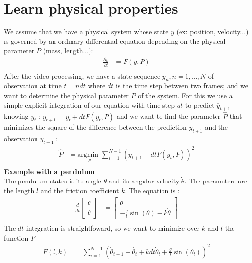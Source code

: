 \documentclass[11pt, oneside]{amsart}
\begin{document}
\section{Learn physical properties}
We assume that we have a physical system whose state $y$ (ex: position, velocity...) is governed by an ordinary differential equation depending on the physical parameter $P$ (mass, length...):
\begin{align*}
  \frac{\partial y}{\partial t} &= F(y, P)\\
\end{align*}
After the video processing, we have a state sequence $y_n, n=1, \ldots, N$ of observation at time $t = n dt$ where $dt$ is the time step between two frames; and we want to determine the physical parameter $P$ of the system.
For this we use a simple explicit integration of our equation with time step $dt$ to predict $\overline{y}_{t+1}$ knowing $y_t$ : $\overline{y}_{t+1} = y_t + dtF(y_t, P)$ and we want to find the parameter $\hat{P}$ that minimizes the square of the difference between the prediction $\overline{y}_{t+1}$ and the observation $y_{t+1}$ :
\begin{align*}
  \hat{P} &= \underset{P}{\text{argmin }} \sum_{i=1}^{N-1}{\left( y_{t+1} - dtF(y_t, P)\right)^2}\\
\end{align*}
\textbf{Example with a pendulum}\\
The pendulum states is its angle $\theta$ and its angular velocity $\dot{\theta}$.
The parameters are the length $l$ and the friction coefficient $k$.
The equation is :
\begin{align*}
  \frac{d}{dt}\left [ \begin{array}{c} \theta \\ \dot{\theta} \end{array} \right ]
    &=
    \left [ \begin{array}{c} \dot{\theta} \\ -\frac{g}{l}\sin(\theta) - k \dot{\theta} \end{array} \right ]
    \\
\end{align*}
The $dt$ integration is straightfoward, so we want to minimize over $k$ and $l$ the function $F$:
\begin{align*}
  F(l, k) &= \sum_{i=1}^{N-1}{\left( \dot{\theta}_{t+1} - \dot{\theta_t} + kdt\dot{\theta}_t + \frac{g}{l}\sin(\theta_t) \right)^2}\\
\end{align*}
\end{document}
